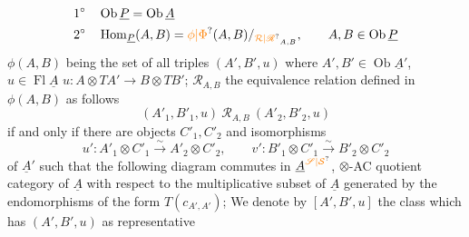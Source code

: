 \[
\begin{aligned}
1^\circ\quad &\operatorname{Ob}\underline P=\operatorname{Ob}\underline A\\
2^\circ\quad &\operatorname{Hom}_{\underline P}(A,B)=\unsure{\phi|\Phi}(A,B)/_{\unsure{\mathcal R|\mathscr R}_{A,B}},\qquad A,B\in\operatorname{Ob}\underline P
\end{aligned}
\]
$\phi(A,B)$ being the set of all triples $(A',B',u)$ where $A',B'\in\operatorname{Ob}\underline A'$, $u\in\operatorname{Fl}\underline A$ $u:A\otimes TA'\longrightarrow B\otimes TB'$; $\mathcal R_{A,B}$ the equivalence relation defined in $\phi(A,B)$ as follows
\[
(A'_1,B'_1,u)\ \mathcal R_{A,B}\ (A'_2,B'_2,u)
\]
if and only if there are objects $C'_1,C'_2$ and isomorphisms
\[
u':A'_1\otimes C'_1\xrightarrow{\sim}A'_2\otimes C'_2,\qquad v':B'_1\otimes C'_1\xrightarrow{\sim}B'_2\otimes C'_2
\]
of $\underline A'$ such that the following diagram commutes in $\underline A^{\unsure{\mathscr S|\mathcal S}}$, $\otimes$-AC quotient category of $\underline A$ with respect to the multiplicative subset of $\underline A$ generated by the endomorphisms of the form $T(c_{A',A'})$;
We denote by $[A',B',u]$ the class which has $(A',B',u)$ as representative

